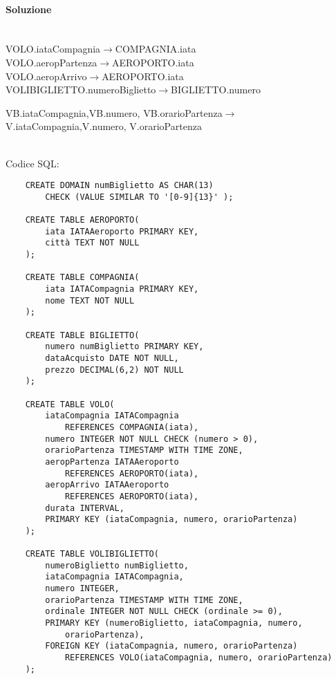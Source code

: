 \documentclass[a4paper, 10pt, titlepage]{article}
\begin{document}
\paragraph{Soluzione}\dotfill
\\VOLO.iataCompagnia$\rightarrow$COMPAGNIA.iata\\
VOLO.aeropPartenza$\rightarrow$AEROPORTO.iata\\
VOLO.aeropArrivo$\rightarrow$AEROPORTO.iata\\
VOLIBIGLIETTO.numeroBiglietto$\rightarrow$BIGLIETTO.numero\\
\begin{small}
VB.iataCompagnia,VB.numero,
VB.orarioPartenza$\rightarrow$V.iataCompagnia,V.numero,
V.orarioPartenza 
\end{small}\medskip \\
Codice SQL:
\lstset{language=SQL}
\begin{lstlisting}
	CREATE DOMAIN numBiglietto AS CHAR(13)
		CHECK (VALUE SIMILAR TO '[0-9]{13}' );
		
	CREATE TABLE AEROPORTO(
		iata IATAAeroporto PRIMARY KEY,
		città TEXT NOT NULL
	);
	
	CREATE TABLE COMPAGNIA(
		iata IATACompagnia PRIMARY KEY,
		nome TEXT NOT NULL
	);
	
	CREATE TABLE BIGLIETTO(
		numero numBiglietto PRIMARY KEY,
		dataAcquisto DATE NOT NULL,
		prezzo DECIMAL(6,2) NOT NULL
	);
	
	CREATE TABLE VOLO(
		iataCompagnia IATACompagnia 
			REFERENCES COMPAGNIA(iata),
		numero INTEGER NOT NULL CHECK (numero > 0),
		orarioPartenza TIMESTAMP WITH TIME ZONE,
		aeropPartenza IATAAeroporto
			REFERENCES AEROPORTO(iata),
		aeropArrivo IATAAeroporto 
			REFERENCES AEROPORTO(iata),
		durata INTERVAL,
		PRIMARY KEY (iataCompagnia, numero, orarioPartenza)
	);
	
	CREATE TABLE VOLIBIGLIETTO(
		numeroBiglietto numBiglietto,
		iataCompagnia IATACompagnia,
		numero INTEGER,
		orarioPartenza TIMESTAMP WITH TIME ZONE,
		ordinale INTEGER NOT NULL CHECK (ordinale >= 0),
		PRIMARY KEY (numeroBiglietto, iataCompagnia, numero,
			orarioPartenza),
		FOREIGN KEY (iataCompagnia, numero, orarioPartenza)
			REFERENCES VOLO(iataCompagnia, numero, orarioPartenza)
	);
\end{lstlisting}
\end{document}
